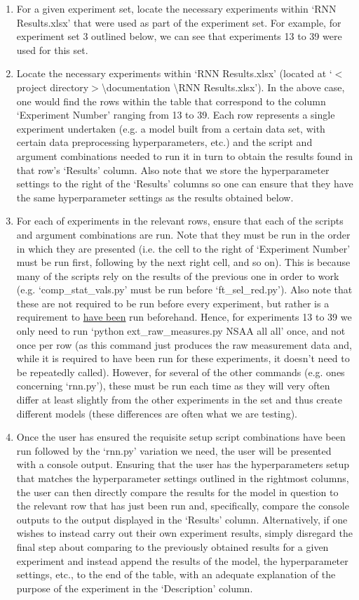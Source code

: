 \documentclass[12pt,twoside]{report}
\begin{document}
\begin{enumerate}
	\item For a given experiment set, locate the necessary experiments within ‘RNN Results.xlsx’ that were used as part of the experiment set. For example, for experiment set 3 outlined below, we can see that experiments 13 to 39 were used for this set.
	\item Locate the necessary experiments within ‘RNN Results.xlsx’ (located at ‘$<$project directory$>$\textbackslash documentation \textbackslash RNN Results.xlsx’). In the above case, one would find the rows within the table that correspond to the column ‘Experiment Number’ ranging from 13 to 39. Each row represents a single experiment undertaken (e.g. a model built from a certain data set, with certain data preprocessing hyperparameters, etc.) and the script and argument combinations needed to run it in turn to obtain the results found in that row’s ‘Results’ column. Also note that we store the hyperparameter settings to the right of the ‘Results’ columns so one can ensure that they have the same hyperparameter settings as the results obtained below.
	\item For each of experiments in the relevant rows, ensure that each of the scripts and argument combinations are run. Note that they must be run in the order in which they are presented (i.e. the cell to the right of ‘Experiment Number’ must be run first, following by the next right cell, and so on). This is because many of the scripts rely on the results of the previous one in order to work (e.g. ‘comp\_stat\_vals.py’ must be run before ‘ft\_sel\_red.py’). Also note that these are not required to be run before every experiment, but rather is a requirement to \underline{have been} run beforehand. Hence, for experiments 13 to 39 we only need to run ‘python ext\_raw\_measures.py NSAA all all’ once, and not once per row (as this command just produces the raw measurement data and, while it is required to have been run for these experiments, it doesn’t need to be repeatedly called). However, for several of the other commands (e.g. ones concerning ‘rnn.py’), these must be run each time as they will very often differ at least slightly from the other experiments in the set and thus create different models (these differences are often what we are testing).
	\item Once the user has ensured the requisite setup script combinations have been run followed by the ‘rnn.py’ variation we need, the user will be presented with a console output. Ensuring that the user has the hyperparameters setup that matches the hyperparameter settings outlined in the rightmost columns, the user can then directly compare the results for the model in question to the relevant row that has just been run and, specifically, compare the console outputs to the output displayed in the ‘Results’ column. Alternatively, if one wishes to instead carry out their own experiment results, simply disregard the final step about comparing to the previously obtained results for a given experiment and instead append the results of the model, the hyperparameter settings, etc., to the end of the table, with an adequate explanation of the purpose of the experiment in the ‘Description’ column.
\end{enumerate}
\end{document}
